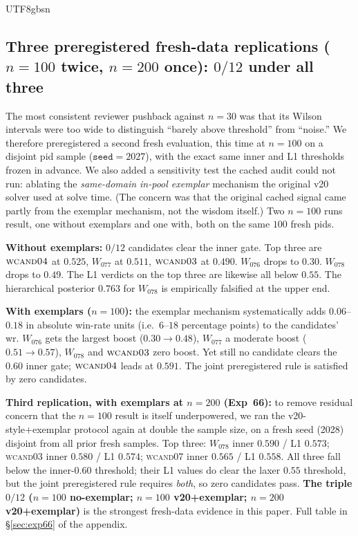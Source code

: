 \documentclass{article}
\begin{document}
\begin{CJK*}{UTF8}{gbsn}
\subsection{Three preregistered fresh-data replications
(\(n=100\) twice, \(n=200\) once): \(0/12\) under all three}
\label{sec:exp-summary-fresh}

The most consistent reviewer pushback against \(n=30\) was that
its Wilson intervals were too wide to distinguish ``barely above
threshold'' from ``noise.'' We therefore preregistered a second
fresh evaluation, this time at \(n=100\) on a disjoint pid sample
(\(\texttt{seed}=2027\)), with the exact same inner and L1
thresholds frozen in advance. We also added a sensitivity test
the cached audit could not run: ablating the \emph{same-domain
in-pool exemplar} mechanism the original v20 solver used at
solve time. (The concern was that the original cached signal
came partly from the exemplar mechanism, not the wisdom itself.)
Two \(n=100\) runs result, one without exemplars and one with,
both on the same \(100\) fresh pids.

\textbf{Without exemplars:} \(0/12\) candidates clear the inner
gate. Top three are \(\textsc{wcand04}\) at \(0.525\), \(W_{077}\)
at \(0.511\), \(\textsc{wcand03}\) at \(0.490\). \(W_{076}\) drops
to \(0.30\). \(W_{078}\) drops to \(0.49\). The L1 verdicts on the
top three are likewise all below \(0.55\). The hierarchical
posterior \(0.763\) for \(W_{078}\) is empirically falsified at
the upper end.

\textbf{With exemplars (\(n=100\)):} the exemplar mechanism
systematically adds \(0.06\)--\(0.18\) in absolute win-rate
units (i.e.\ \(6\)--\(18\) percentage points) to the candidates'
wr.
\(W_{076}\) gets the largest boost (\(0.30 \to 0.48\)),
\(W_{077}\) a moderate boost (\(0.51 \to 0.57\)), \(W_{078}\) and
\(\textsc{wcand03}\) zero boost. Yet still no candidate clears
the \(0.60\) inner gate; \(\textsc{wcand04}\) leads at \(0.591\).
The joint preregistered rule is satisfied by zero candidates.

\textbf{Third replication, with exemplars at \(n=200\) (Exp~66):}
to remove residual concern that the \(n=100\) result is itself
underpowered, we ran the v20-style+exemplar protocol again at
double the sample size, on a fresh seed (2028) disjoint from all
prior fresh samples. Top three: \(W_{078}\) inner \(0.590\) /
L1 \(0.573\); \textsc{wcand03} inner \(0.580\) / L1 \(0.574\);
\textsc{wcand07} inner \(0.565\) / L1 \(0.558\). All three fall
below the inner-\(0.60\) threshold; their L1 values do clear the
laxer \(0.55\) threshold, but the joint preregistered rule
requires \emph{both}, so zero candidates pass. \textbf{The triple
\(0/12\) (\(n{=}100\) no-exemplar; \(n{=}100\) v20+exemplar;
\(n{=}200\) v20+exemplar)} is the strongest fresh-data evidence
in this paper. Full table in
\S\ref{sec:exp66} of the appendix.


\end{CJK*}
\end{document}
